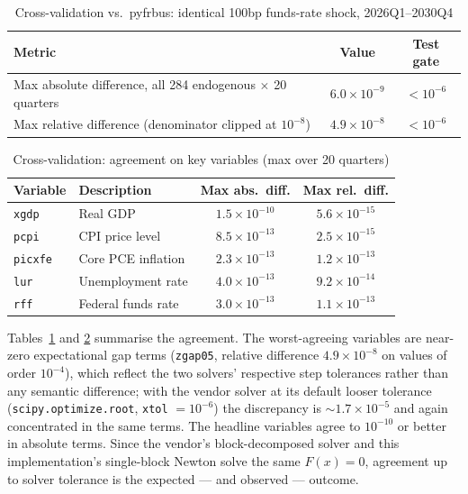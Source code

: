 \begin{table}[htbp]
\centering
\caption{Cross-validation vs.\ pyfrbus: identical 100bp funds-rate shock, 2026Q1--2030Q4}
\label{tab:crossval}
\begin{tabular}{lcc}
\toprule
Metric & Value & Test gate \\
\midrule
Max absolute difference, all 284 endogenous $\times$ 20 quarters & $6.0\times10^{-9}$ & $<10^{-6}$ \\
Max relative difference (denominator clipped at $10^{-8}$) & $4.9\times10^{-8}$ & $<10^{-6}$ \\
\bottomrule
\end{tabular}
\end{table}

\begin{table}[htbp]
\centering
\caption{Cross-validation: agreement on key variables (max over 20 quarters)}
\label{tab:crossval-key}
\begin{tabular}{llcc}
\toprule
Variable & Description & Max abs.\ diff. & Max rel.\ diff. \\
\midrule
\texttt{xgdp}   & Real GDP                & $1.5\times10^{-10}$ & $5.6\times10^{-15}$ \\
\texttt{pcpi}   & CPI price level          & $8.5\times10^{-13}$ & $2.5\times10^{-15}$ \\
\texttt{picxfe} & Core PCE inflation       & $2.3\times10^{-13}$ & $1.2\times10^{-13}$ \\
\texttt{lur}    & Unemployment rate        & $4.0\times10^{-13}$ & $9.2\times10^{-14}$ \\
\texttt{rff}    & Federal funds rate       & $3.0\times10^{-13}$ & $1.1\times10^{-13}$ \\
\bottomrule
\end{tabular}
\end{table}

Tables~\ref{tab:crossval} and \ref{tab:crossval-key} summarise the agreement. The worst-agreeing variables are near-zero expectational gap terms (\texttt{zgap05}, relative difference $4.9\times10^{-8}$ on values of order $10^{-4}$), which reflect the two solvers' respective step tolerances rather than any semantic difference; with the vendor solver at its default looser tolerance (\texttt{scipy.optimize.root}, \texttt{xtol} $=10^{-6}$) the discrepancy is $\sim1.7\times10^{-5}$ and again concentrated in the same terms. The headline variables agree to $10^{-10}$ or better in absolute terms. Since the vendor's block-decomposed solver and this implementation's single-block Newton solve the same $F(x)=0$, agreement up to solver tolerance is the expected --- and observed --- outcome.
